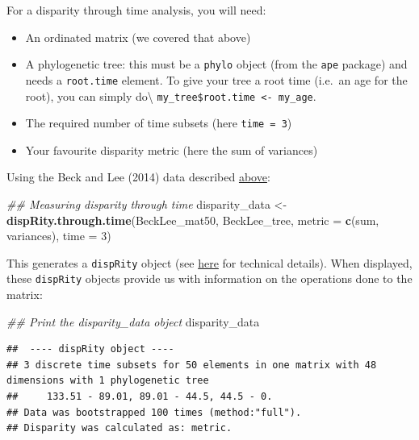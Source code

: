\documentclass[
]{book}
\newenvironment{Shaded}{\begin{snugshade}}{\end{snugshade}}
\newcommand{\CommentTok}[1]{\textcolor[rgb]{0.56,0.35,0.01}{\textit{#1}}}
\newcommand{\DataTypeTok}[1]{\textcolor[rgb]{0.13,0.29,0.53}{#1}}
\newcommand{\DecValTok}[1]{\textcolor[rgb]{0.00,0.00,0.81}{#1}}
\newcommand{\KeywordTok}[1]{\textcolor[rgb]{0.13,0.29,0.53}{\textbf{#1}}}
\newcommand{\NormalTok}[1]{#1}
\newcommand{\StringTok}[1]{\textcolor[rgb]{0.31,0.60,0.02}{#1}}
\providecommand{\tightlist}{%
  \setlength{\itemsep}{0pt}\setlength{\parskip}{0pt}}
\begin{document}
For a disparity through time analysis, you will need:

\begin{itemize}
\tightlist
\item
  An ordinated matrix (we covered that above)
\item
  A phylogenetic tree: this must be a \texttt{phylo} object (from the \texttt{ape} package) and needs a \texttt{root.time} element. To give your tree a root time (i.e.~an age for the root), you can simply do\textbackslash{} \texttt{my\_tree\$root.time\ \textless{}-\ my\_age}.
\item
  The required number of time subsets (here \texttt{time\ =\ 3})
\item
  Your favourite disparity metric (here the sum of variances)
\end{itemize}

Using the Beck and Lee (2014) data described \protect\hyperlink{example-data}{above}:

\begin{Shaded}
\begin{Highlighting}[]
\CommentTok{\#\# Measuring disparity through time}
\NormalTok{disparity\_data \textless{}{-}}\StringTok{ }\KeywordTok{dispRity.through.time}\NormalTok{(BeckLee\_mat50, BeckLee\_tree,}
                                        \DataTypeTok{metric =} \KeywordTok{c}\NormalTok{(sum, variances),}
                                        \DataTypeTok{time =} \DecValTok{3}\NormalTok{)}
\end{Highlighting}
\end{Shaded}

This generates a \texttt{dispRity} object (see \protect\hyperlink{guts}{here} for technical details).
When displayed, these \texttt{dispRity} objects provide us with information on the operations done to the matrix:

\begin{Shaded}
\begin{Highlighting}[]
\CommentTok{\#\# Print the disparity\_data object}
\NormalTok{disparity\_data}
\end{Highlighting}
\end{Shaded}

\begin{verbatim}
##  ---- dispRity object ---- 
## 3 discrete time subsets for 50 elements in one matrix with 48 dimensions with 1 phylogenetic tree
##     133.51 - 89.01, 89.01 - 44.5, 44.5 - 0.
## Data was bootstrapped 100 times (method:"full").
## Disparity was calculated as: metric.
\end{verbatim}
\end{document}
